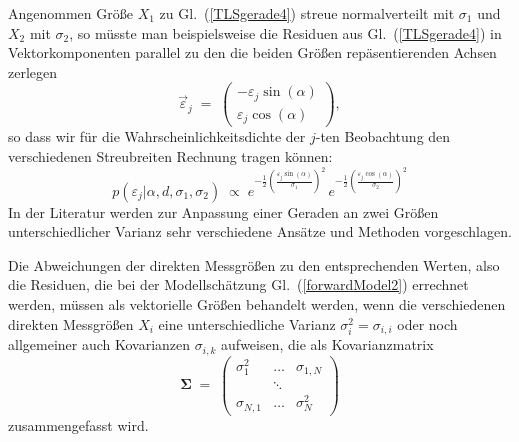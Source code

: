 Angenommen Größe $X_1$ zu Gl.~(\ref{TLSgerade4}) streue normalverteilt mit $\sigma_1$ und
$X_2$ mit $\sigma_2$, so müsste man beispielsweise die Residuen aus Gl.~(\ref{TLSgerade4}) in
Vektorkomponenten parallel zu den die beiden Größen repäsentierenden Achsen zerlegen
\begin{equation}
\vec \varepsilon_j \; = \;
\left(\begin{array}{c}
-\varepsilon_j \sin(\alpha)\\
\varepsilon_j \cos(\alpha)
\end{array}\right) ,
\end{equation}
so dass wir für die Wahrscheinlichkeitsdichte
der $j$-ten Beobachtung den verschiedenen Streubreiten Rechnung tragen können:
\begin{equation}
p(\varepsilon_j | \alpha, d, \sigma_1, \sigma_2) \; \propto \;
e^{-\frac{1}{2} \left(\frac{\varepsilon_j \sin(\alpha)}{\sigma_1}\right)^2}
\, e^{-\frac{1}{2} \left(\frac{\varepsilon_j \cos(\alpha)}{\sigma_2}\right)^2}
\end{equation}
In der Literatur werden zur Anpassung einer Geraden an zwei Größen
unterschiedlicher Varianz sehr verschiedene Ansätze und Methoden vorgeschlagen.

Die Abweichungen der direkten Messgrößen zu den entsprechenden Werten, also die Residuen,
die bei der Modellschätzung Gl.~(\ref{forwardModel2}) errechnet werden, müssen als
vektorielle Größen behandelt werden, wenn die verschiedenen direkten Messgrößen $X_i$ eine
unterschiedliche Varianz $\sigma_i^2 = \sigma_{i,i}$ oder noch allgemeiner auch
Kovarianzen $\sigma_{i,k}$ aufweisen, die als Kovarianzmatrix
\begin{equation}
\boldsymbol{\Sigma} \; = \;
\left(\begin{array}{ccc}
\sigma_1^2 & \dots & \sigma_{1,N}\\
 & \ddots & \\
\sigma_{N,1} & \dots & \sigma_N^2
\end{array}\right)
\end{equation}
zusammengefasst wird.

